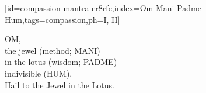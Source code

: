 %
\setcounter{ulSongNumber}{470}


[id={compassion-mantra-er8rfe},index={Om Mani Padme Hum},tags={compassion},ph={I, II}]
  \vspace{1em}
  \vspace{-2em}
  \begin{feeler}
    OM,\\
    the jewel (method; MANI)\\
    in the lotus (wisdom; PADME)\\
    indivisible (HUM).\\\vspace{1em}
    Hail to the Jewel in the Lotus.
  \end{feeler}
